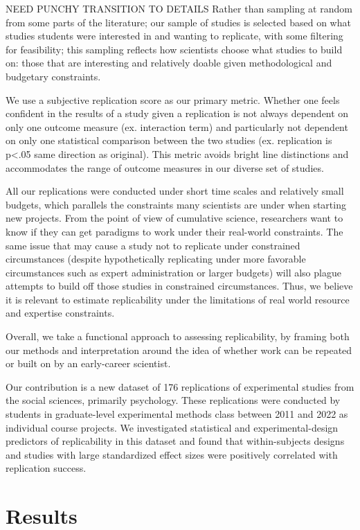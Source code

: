 \documentclass[
  english,
  a4paper,
]{article}
\begin{document}
NEED PUNCHY TRANSITION TO DETAILS Rather than sampling at random from some parts of the literature; our sample of studies is selected based on what studies students were interested in and wanting to replicate, with some filtering for feasibility; this sampling reflects how scientists choose what studies to build on: those that are interesting and relatively doable given methodological and budgetary constraints.

We use a subjective replication score as our primary metric. Whether one feels confident in the results of a study given a replication is not always dependent on only one outcome measure (ex. interaction term) and particularly not dependent on only one statistical comparison between the two studies (ex. replication is p\textless.05 same direction as original). This metric avoids bright line distinctions and accommodates the range of outcome measures in our diverse set of studies.

All our replications were conducted under short time scales and relatively small budgets, which parallels the constraints many scientists are under when starting new projects. From the point of view of cumulative science, researchers want to know if they can get paradigms to work under their real-world constraints. The same issue that may cause a study not to replicate under constrained circumstances (despite hypothetically replicating under more favorable circumstances such as expert administration or larger budgets) will also plague attempts to build off those studies in constrained circumstances. Thus, we believe it is relevant to estimate replicability under the limitations of real world resource and expertise constraints.

Overall, we take a functional approach to assessing replicability, by framing both our methods and interpretation around the idea of whether work can be repeated or built on by an early-career scientist.

Our contribution is a new dataset of 176 replications of experimental studies from the social sciences, primarily psychology. These replications were conducted by students in graduate-level experimental methods class between 2011 and 2022 as individual course projects. We investigated statistical and experimental-design predictors of replicability in this dataset and found that within-subjects designs and studies with large standardized effect sizes were positively correlated with replication success.

\hypertarget{results}{%
\section{Results}\label{results}}
\end{document}
